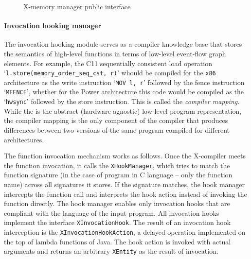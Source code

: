 \begin{figure}[h]
\centering

\caption{X-memory manager public interface}
\label{fig:mem-manager}
\end{figure}


\paragraph{Invocation hooking manager}

The invocation hooking module serves as a compiler knowledge base that stores the semantics of high-level functions in terms of low-level event-flow graph elements.
For example, the C11 sequentially consistent load operation `\lstinline{l.store(memory_order_seq_cst, r)}' whould be compiled for the \texttt{x86} architecture as the write instruction `\lstinline{MOV l, r}' followed by the fence instruction `\lstinline{MFENCE}', whether for the Power architecture this code would be compiled as the `\lstinline{hwsync}' followed by the store instruction.
This is called the \textit{compiler mapping}.
While the \xgraph{} is the abstract (hardware-agnostic) low-level program representation, the compiler mapping is the only component of the compiler that produces differences between two versions of the same program compiled for different architectures.
 
The function invocation mechanism works as follows.
Once the X-compiler meets the function invocation, it calls the \texttt{XHookManager}, which tries to match the function signature (in the case of program in C language -- only the function name) across all signatures it stores.
If the signature matches, the hook manager intercepts the function call and interprets the hook action instead of invoking the function directly.
The hook manager enables only invocation hooks that are compliant with the language of the input program.
All invocation hooks implement the interface \texttt{XInvocationHook}.
The result of an invocation hook interception is the \texttt{XInvocationHookAction}, a delayed operation implemented on the top of lambda functions of Java.
The hook action is invoked with actual arguments and returns an arbitrary \texttt{XEntity} as the result of invocation.

